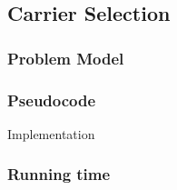 \documentclass{article}
\begin{document}
\subsection*{Carrier Selection}

\subsubsection*{Problem Model}

\subsubsection*{Pseudocode}

\begin{algorithm}[H]
\caption{Implementation}
\begin{algorithmic}[1]
\end{algorithmic}
\end{algorithm}

\subsubsection*{Running time}
\end{document}
